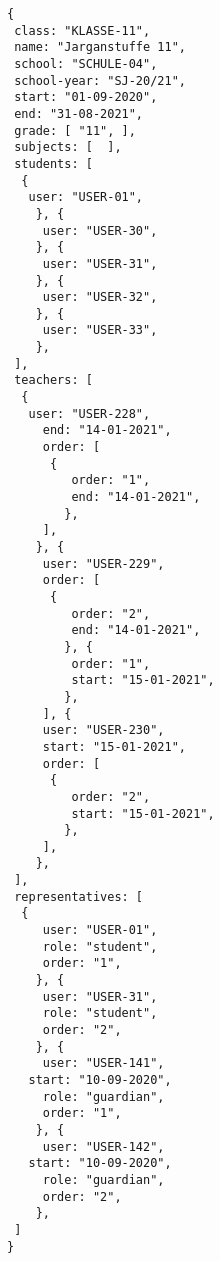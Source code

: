 
\begin{lstlisting}[caption={Klassen-Datenmodell Beispiel 2: Jahrgangstufe 11, Sekundarstufe 2},frame=tlrb]
{
 class: "KLASSE-11",
 name: "Jarganstuffe 11",
 school: "SCHULE-04",
 school-year: "SJ-20/21",
 start: "01-09-2020",
 end: "31-08-2021",
 grade: [ "11", ],
 subjects: [  ],
 students: [
  { 
   user: "USER-01",
	}, { 
	 user: "USER-30",
	}, { 
	 user: "USER-31",
	}, { 
	 user: "USER-32",
	}, { 
	 user: "USER-33",
	},
 ],
 teachers: [
  { 
   user: "USER-228",
	 end: "14-01-2021",
	 order: [
	  {
		 order: "1",
		 end: "14-01-2021",
		},
	 ],
	}, { 
	 user: "USER-229",
	 order: [
	  {
		 order: "2",
		 end: "14-01-2021",
		}, {
		 order: "1",
		 start: "15-01-2021",
		},
	 ], { 
	 user: "USER-230",
	 start: "15-01-2021",
	 order: [
	  {
		 order: "2",
		 start: "15-01-2021",
		},
	 ],
	},
 ],
 representatives: [
  {
	 user: "USER-01",
	 role: "student",
	 order: "1",	 
	}, {
	 user: "USER-31",
	 role: "student",
	 order: "2",	 
	}, {
	 user: "USER-141",
   start: "10-09-2020",
	 role: "guardian",
	 order: "1",	 
	}, {
	 user: "USER-142",
   start: "10-09-2020",
	 role: "guardian",
	 order: "2",	 
	},  
 ]
}
\end{lstlisting}